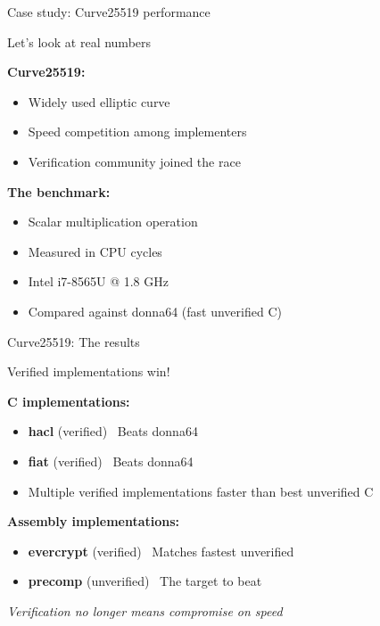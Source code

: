 \documentclass[aspectratio=169, lualatex, handout]{beamer}
\begin{document}
\begin{frame}{Case study: Curve25519 performance}
	\begin{center}
		\Large
		Let's look at real numbers
	\end{center}
	\vspace{1em}
	\textbf{Curve25519:}
	\begin{itemize}
		\item Widely used elliptic curve
		\item Speed competition among implementers
		\item Verification community joined the race
	\end{itemize}
	\vspace{0.5em}
	\textbf{The benchmark:}
	\begin{itemize}
		\item Scalar multiplication operation
		\item Measured in CPU cycles
		\item Intel i7-8565U @ 1.8 GHz
		\item Compared against donna64 (fast unverified C)
	\end{itemize}
\end{frame}

\begin{frame}{Curve25519: The results}
	\begin{center}
		\Large
		Verified implementations win!
	\end{center}
	\vspace{1em}
	\textbf{C implementations:}
	\begin{itemize}
		\item \textbf{hacl} (verified) \rightarrow\ Beats donna64
		\item \textbf{fiat} (verified) \rightarrow\ Beats donna64
		\item Multiple verified implementations faster than best unverified C
	\end{itemize}
	\vspace{0.5em}
	\textbf{Assembly implementations:}
	\begin{itemize}
		\item \textbf{evercrypt} (verified) \rightarrow\ Matches fastest unverified
		\item \textbf{precomp} (unverified) \rightarrow\ The target to beat
	\end{itemize}
	\vspace{0.5em}
	\begin{center}
		\textit{Verification no longer means compromise on speed}
	\end{center}
\end{frame}
\end{document}
